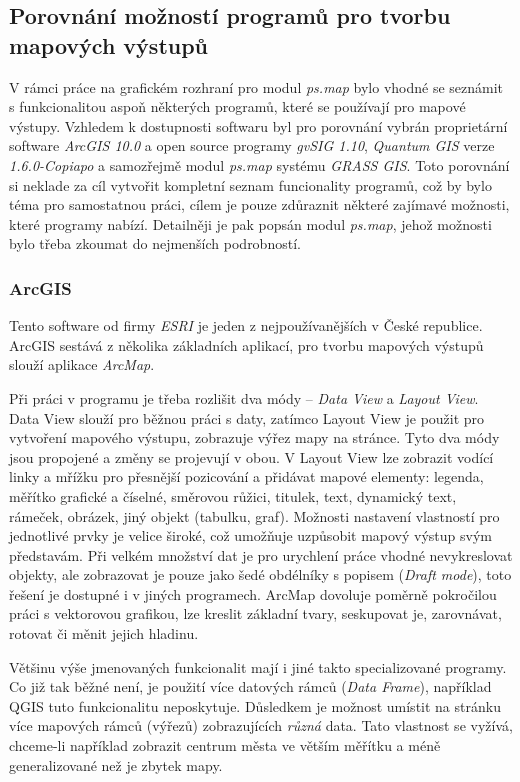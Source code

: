 \documentclass[a4paper,12pt,draft]{article}
\newcommand{\modul}[1]{\emph{#1}}
\begin{document}
\subsection{Porovnání možností programů pro tvorbu mapových výstupů}
V rámci práce na grafickém rozhraní pro modul \modul{ps.map} bylo
vhodné se seznámit s funkcionalitou aspoň některých programů, které
se používají pro mapové výstupy. Vzhledem k dostupnosti softwaru byl
pro porovnání vybrán proprietární software \emph{ArcGIS 10.0} a
open source programy \emph{gvSIG 1.10}, \emph{Quantum GIS} verze
\emph{1.6.0-Copiapo} a samozřejmě modul \modul{ps.map} systému \emph{GRASS
GIS}.
Toto porovnání si neklade za cíl vytvořit kompletní seznam
funcionality programů, což by bylo téma pro samostatnou práci,
cílem je pouze zdůraznit některé zajímavé možnosti, které programy
nabízí. Detailněji je pak popsán modul \modul{ps.map}, jehož možnosti
bylo třeba zkoumat do nejmenších podrobností.

\subsubsection{ArcGIS}
Tento software od firmy \emph{ESRI} je jeden z nejpoužívanějších v
České republice. ArcGIS sestává z několika základních aplikací,
pro tvorbu mapových výstupů slouží aplikace \emph{ArcMap}.

Při práci v programu je třeba rozlišit dva módy -- \emph{Data View}
a \emph{Layout View}. Data View slouží pro běžnou práci s daty,
zatímco Layout View je použit pro vytvoření mapového výstupu,
zobrazuje výřez mapy na stránce. Tyto dva módy jsou propojené a
změny se projevují v obou. V Layout View lze zobrazit vodící linky a
mřížku pro přesnější pozicování  a  přidávat mapové elementy:
legenda, měřítko grafické a číselné, směrovou růžici, titulek,
text, dynamický text, rámeček, obrázek, jiný objekt (tabulku, graf).
Možnosti nastavení vlastností pro jednotlivé prvky je velice široké,
což umožňuje uzpůsobit mapový výstup svým představám. Při velkém
množství dat je pro urychlení práce vhodné nevykreslovat objekty, ale
zobrazovat je pouze jako šedé obdélníky s popisem (\emph{Draft mode}),
toto řešení je dostupné i v jiných programech. ArcMap dovoluje poměrně
pokročilou práci s vektorovou grafikou, lze kreslit základní tvary,
seskupovat je, zarovnávat, rotovat či měnit jejich hladinu.

Většinu výše jmenovaných funkcionalit mají i jiné takto
specializované programy. Co již tak běžné není, je použití více
datových rámců (\emph{Data Frame}), například QGIS tuto funkcionalitu
neposkytuje. Důsledkem je možnost umístit na stránku více mapových
rámců (výřezů) zobrazujících \emph{různá} data. Tato vlastnost
se vyžívá, chceme-li například zobrazit centrum města ve větším
měřítku a méně generalizované než je zbytek mapy.
\end{document}

